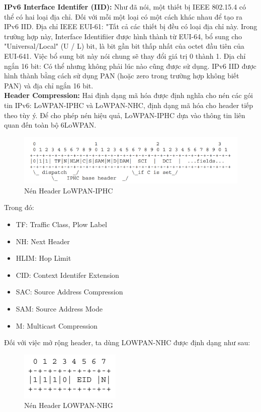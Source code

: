 \documentclass{report}
\begin{document}
\textbf{IPv6 Interface Identifer (IID):} Như đã nói, một thiết bị IEEE 802.15.4 có thể có hai loại
địa chỉ. Đối với mỗi một loại có một cách khác nhau để tạo ra IPv6 IID. Địa chỉ IEEE EUI-61:
"Tất cả các thiết bị đều có loại địa chỉ này. Irong trường hợp này, Interface Identifiier được hình
thành từ EUI-64, bổ sung cho "Universal/Local" (U / L) bit, là bit gần bit thấp nhất của octet
đầu tiên của EUI-641. Việc bổ sung bit này nói chung sẽ thay đổi giá trị 0 thành 1. Địa chỉ ngắn
16 bit: Có thể nhưng không phải lúc nào cũng được sử dụng. IPv6 IID được hình thành bằng
cách sử dụng PAN (hoặc zero trong trường hợp không biết PAN) và địa chỉ ngắn 16 bit. \\

\textbf{Header Compression:} Hai định dạng mã hóa được định nghĩa cho nén các gói tin IPv6:
LoWPAN-IPHC và LoWPAN-NHC, định dạng mã hóa cho header tiếp theo tùy ý. Để cho phép
nén hiệu quả, LoWPAN-IPHC dựa vào thông tin liên quan đến toàn bộ 6LoWPAN.

\begin{figure}[h]
	\centering
	\includegraphics[scale = 0.7]{fig28.png}
	\caption{Nén Header LoWPAN-IPHC}
	\label{fig:Graph28}
\end{figure}

Trong đó:
\begin{itemize}
	\item TF: Traffic Class, Plow Label
	\item NH: Next Header
	\item HLIM: Hop Lìmit
	\item CID: Context Identifer Extension
	\item SAC: Source Address Compression
	\item SAM: Source Address Mode
	\item M: Multicast Compression
\end{itemize}
\newpage
Đối với việc mở rộng header, ta dùng LOWPAN-NHC được định dạng như sau:

\begin{figure}[h]
	\centering
	\includegraphics[scale = 0.7]{fig29.png}
	\caption{Nén Header LOWPAN-NHG}
	\label{fig:Graph29}
\end{figure}
\end{document}
